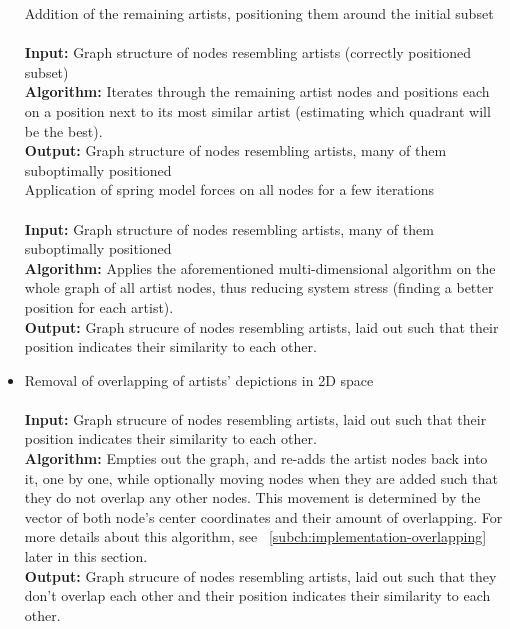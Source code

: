 \begin{itemize}
		\subitem Addition of the remaining artists, positioning them around the initial subset \\\\
				\textbf{Input:} Graph structure of nodes resembling artists (correctly positioned subset) \\
				\textbf{Algorithm:} Iterates through the remaining artist nodes and positions each on a position
				next to its most similar artist (estimating which quadrant will be the best). \\
				\textbf{Output:} Graph structure of nodes resembling artists, many of them suboptimally positioned \\
				
		\subitem Application of spring model forces on all nodes for a few iterations \\\\
				\textbf{Input:} Graph structure of nodes resembling artists, many of them suboptimally positioned \\
				\textbf{Algorithm:} Applies the aforementioned multi-dimensional algorithm on the whole graph of
				all artist nodes, thus reducing system stress (finding a better position for each artist).  \\
				\textbf{Output:} Graph strucure of nodes resembling artists, laid out such that their position 
				indicates their similarity to each other.\\
				
	\item Removal of overlapping of artists' depictions in 2D space	\\\\
				\textbf{Input:} Graph strucure of nodes resembling artists, laid out such that their position 
				indicates their similarity to each other. \\
				\textbf{Algorithm:} Empties out the graph, and re-adds the artist nodes back into it, one by one,
				while optionally moving nodes when they are added such that they do not overlap any other nodes. This
				movement is determined by the vector of both node's center coordinates and their amount
				of overlapping. For more details about this algorithm, see 
				~\ref{subch:implementation-overlapping} later in this section. \\
				\textbf{Output:} Graph strucure of nodes resembling artists, laid out such that they don't 
				overlap each other and their position indicates their similarity to each other. \\
				

\end{itemize}
